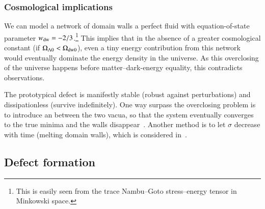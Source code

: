     \subsubsection{Cosmological implications}
        We can model a network of domain walls a perfect fluid with equation-of-state parameter $w_\mathrm{dw}= -2/3$.\footnote{This is easily seen from the trace Nambu--Goto stress--energy tensor in Minkowski space.} This implies that in the absence of a greater cosmological constant (if $\Omega_{\Lambda 0} < \Omega_\mathrm{dw0}$), 
        even a tiny energy contribution from this network would eventually dominate the energy density in the universe. As this overclosing of the universe happens before matter--dark-energy equality, this contradicts observations.

        The prototypical defect is manifestly stable (robust against perturbations) and dissipationless (survive indefinitely). One way surpass the overclosing problem is to introduce an  between the two vacua, so that the system eventually converges to the true minima and the walls disappear~\citep{saikawaReviewGravitationalWaves2017}. Another method is to let $\sigma$ decrease with time (melting domain walls), which is considered in~\citet{babichevNANOGravSpectralIndex2023}.


















\subsection{Defect formation}\label{sec:cosmo:defects:formation}

